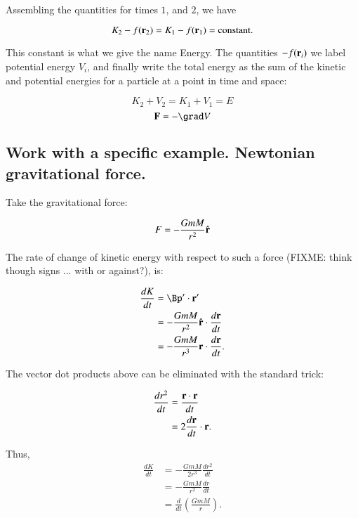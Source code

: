\documentclass{article}      %
\begin{document}
Assembling the quantities for times $1$, and $2$, we have

\begin{equation}
K_2 -f(\mathbf{r}_2) = K_1 - f(\mathbf{r}_1) = \text{constant}.
\end{equation}

This constant is what we give the name Energy.  The quantities $-f(\mathbf{r}_i)$ we label potential energy $V_i$, and finally write the total energy as the sum of the kinetic and potential energies for a particle at a point in time and space:

\begin{equation}
K_2 + V_2 = K_1 + V_1 = E
\end{equation}
\begin{equation}
\BF = -\grad V
\end{equation}

\subsection{Work with a specific example.  Newtonian gravitational force.}

Take the gravitational force:

\begin{equation}
F = -\frac{GmM}{r^2} \hat{\mathbf{r}}
\end{equation}

The rate of change of kinetic energy with respect to such a force (FIXME: think though signs ... with or against?), is:

\begin{align*}
\frac{dK}{dt} 
&= \Bp' \cdot \Br' \\
&= -\frac{GmM}{r^2} \rcap \cdot \frac{d\Br}{dt} \\
&= -\frac{GmM}{r^3} \Br \cdot \frac{d\Br}{dt}.
\end{align*}

The vector dot products above can be eliminated with the standard trick:

\begin{align*}
\frac{dr^2}{dt} 
&= \frac{\mathbf{r} \cdot \mathbf{r}}{dt} \\
&= 2 \frac{d\mathbf{r}}{dt} \cdot \mathbf{r}.
\end{align*}

Thus,
\begin{align*}
\frac{dK}{dt} 
&= -\frac{GmM }{2r^3} \frac{dr^2}{dt} \\
&= -\frac{GmM }{r^2} \frac{dr}{dt} \\
&= \frac{d}{dt} \left( \frac{GmM }{r} \right).
\end{align*}
\end{document}
